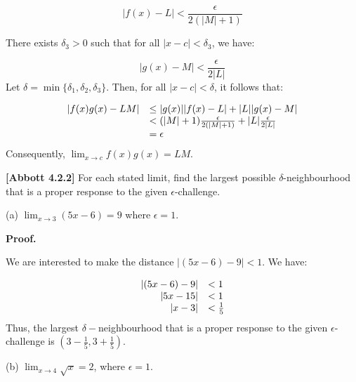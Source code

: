 \documentclass[10pt]{article}
\begin{document}
\begin{equation*}
|f( x) -L|< \frac{\epsilon }{2( |M|+1)}
\end{equation*}


There exists $\displaystyle \delta _{3}  >0$ such that for all $\displaystyle |x-c|< \delta _{3}$, we have:


\begin{equation*}
|g( x) -M|< \frac{\epsilon }{2|L|}
\end{equation*}
Let $\displaystyle \delta =\min\{\delta _{1} ,\delta _{2} ,\delta _{3}\}$. Then, for all $\displaystyle |x-c|< \delta $, it follows that:


\begin{equation*}
\begin{array}{ c l }
|f( x) g( x) -LM| & \leq |g( x) ||f( x) -L|+|L||g( x) -M|\\
 & < ( |M|+1)\frac{\epsilon }{2( |M|+1)} +|L|\frac{\epsilon }{2|L|}\\
 & =\epsilon 
\end{array}
\end{equation*}
Consequently, $\displaystyle \lim _{x\rightarrow c} f( x) g( x) =LM$.



\textbf{[Abbott 4.2.2]} For each stated limit, find the largest possible $\displaystyle \delta $-neighbourhood that is a proper response to the given $\displaystyle \epsilon $-challenge.



(a) $\displaystyle \lim _{x\rightarrow 3}( 5x-6) =9$ where $\displaystyle \epsilon =1$.



\textbf{Proof.}



We are interested to make the distance $\displaystyle |( 5x-6) -9|< 1$. We have:


\begin{equation*}
\begin{array}{ r l }
|( 5x-6) -9| & < 1\\
|5x-15| & < 1\\
|x-3| & < \frac{1}{5}
\end{array}
\end{equation*}
Thus, the largest $\displaystyle \delta -$neighbourhood that is a proper response to the given $\displaystyle \epsilon $-challenge is $\displaystyle \left( 3-\frac{1}{5} ,3+\frac{1}{5}\right)$.



(b) $\displaystyle \lim _{x\rightarrow 4}\sqrt{x} =2$, where $\displaystyle \epsilon =1$.
\end{document}
